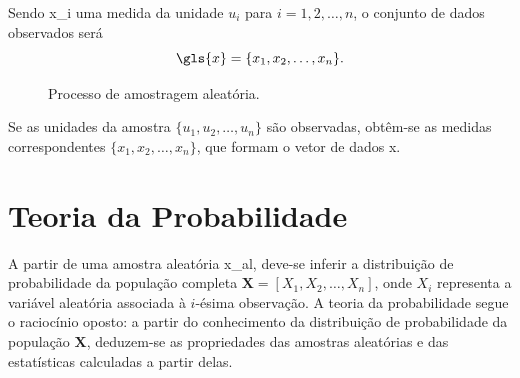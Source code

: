 Sendo \gls{x_i} uma medida da unidade $u_i$ para $i = 1, 2, \ldots, n$, o conjunto de dados observados será
\begin{equation}
    \gls{x} = \{x_1, x_2, \ldots, x_n\}.
\end{equation}
\begin{figure}[H]%
\centering
\caption{Processo de amostragem aleatória.}
\label{fig:amoale}
\end{figure}
Se as unidades da amostra $\{u_1, u_2, \ldots, u_n\}$ são observadas, obtêm-se as medidas correspondentes $\{x_1, x_2, \ldots, x_n\}$, que formam o vetor de dados \gls{x}.

\section{Teoria da Probabilidade}
\label{sec:teopro}
A partir de uma amostra aleatória \gls{x_al}, deve-se inferir a distribuição de probabilidade da população completa $\mathbf{X} = [X_1, X_2, \ldots, X_n]$, onde $X_i$ representa a variável aleatória associada à $i$-ésima observação. A teoria da probabilidade segue o raciocínio oposto: a partir do conhecimento da distribuição de probabilidade da população $\mathbf{X}$, deduzem-se as propriedades das amostras aleatórias e das estatísticas calculadas a partir delas.

